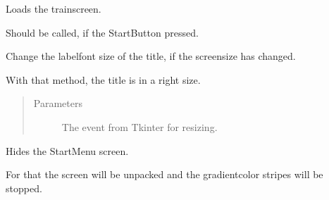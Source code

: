 \documentclass[letterpaper,10pt,english]{sphinxmanual}
\begin{document}
\begin{fulllineitems}
\begin{fulllineitems}
\label{\detokenize{anoog.automation:anoog.automation.graphical_user_interface.Menu.event_button_start}}
\sphinxAtStartPar
Loads the train\sphinxhyphen{}screen.

\sphinxAtStartPar
Should be called, if the Start\sphinxhyphen{}Button pressed.

\end{fulllineitems}


\begin{fulllineitems}
\label{\detokenize{anoog.automation:anoog.automation.graphical_user_interface.Menu.event_resize_label}}
\sphinxAtStartPar
Change the label\sphinxhyphen{}font size of the title, if the screen\sphinxhyphen{}size has changed.

\sphinxAtStartPar
With that method, the title is in a right size.
\begin{quote}\begin{description}
\item[{Parameters}] \leavevmode
\sphinxAtStartPar
{} \textendash{} The event from Tkinter for resizing.

\end{description}\end{quote}

\end{fulllineitems}


\begin{fulllineitems}
\label{\detokenize{anoog.automation:anoog.automation.graphical_user_interface.Menu.hide}}
\sphinxAtStartPar
Hides the Start\sphinxhyphen{}Menu screen.

\sphinxAtStartPar
For that the screen will be unpacked and the gradient\sphinxhyphen{}color stripes will be stopped.

\end{fulllineitems}


\end{fulllineitems}
\end{document}
